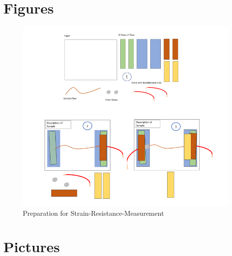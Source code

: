 \begin{appendices}
\label{sec:Appendix}



\section{Figures}
\label{appendix:fig}

\begin{figure}[hb!]
    \centering
    \includegraphics[width=.8\textwidth]{./pic/Meas_Prep_Together.PNG}
    \caption{Preparation for 
Strain-Resistance-Measurement}
    \label{fig:MeasPrep}
\end{figure}

\section{Pictures}




\end{appendices}

